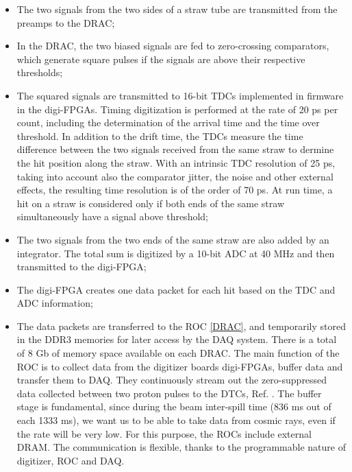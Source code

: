 \begin{itemize}
    \item The two signals from the two sides of a straw tube are transmitted 
    from the preamps to the DRAC;
    \item In the DRAC, the two biased signals are fed to zero-crossing comparators, 
    which generate square pulses if the signals are above their respective thresholds;
    \item The squared signals are transmitted to 16-bit TDCs implemented 
    in firmware in the digi-FPGAs. Timing digitization is performed at the rate 
    of 20 ps per count, including the determination of the arrival time and the 
    time over threshold. In addition to the drift time, the TDCs 
    measure the time difference between the two signals received from the 
    same straw to dermine the hit position along the straw. With an 
    intrinsic TDC resolution of 25 ps, taking into account also the comparator jitter, 
    the noise and other external effects, the resulting time resolution 
    is of the order of 70 ps. At run time, a hit on a straw 
    is considered only if both ends of the same straw simultaneously have a 
    signal above threshold;
    \item The two signals from the two ends of the same straw are also 
    added by an integrator. The total sum is digitized by a 10-bit 
    ADC at 40 MHz and then transmitted to the digi-FPGA;
    \item The digi-FPGA creates one data packet for each hit based on the 
    TDC and ADC information;
    \item The data packets are transferred to the ROC \ref{DRAC}, and 
    temporarily stored in the DDR3 memories for later access by the DAQ system. 
    There is a total of 8 Gb of memory space available on each DRAC. 
    The main function of the ROC is to collect data from the digitizer boards 
    digi-FPGAs, buffer data and transfer them to DAQ. They continuously stream out 
    the zero-suppressed data collected between two proton pulses to the DTCs, 
    Ref. \cite{GIOIOSA2023167732}. The buffer stage is fundamental, 
    since during the beam inter-spill time (836 ms out of each 1333 ms), 
    we want us to be able to take data from cosmic rays, even if the rate 
    will be very low. For this purpose, the ROCs include external DRAM. 
    The communication is flexible, thanks to the 
    programmable nature of digitizer, ROC and DAQ.
\end{itemize}


